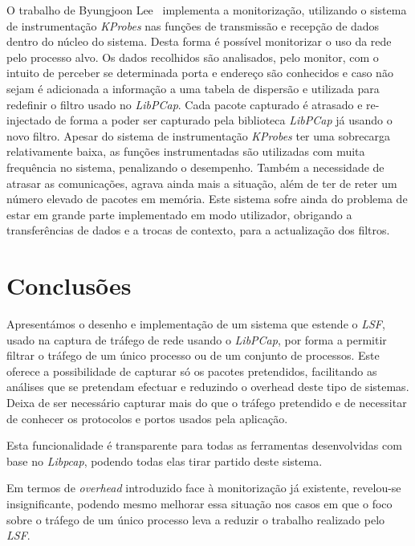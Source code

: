 \documentclass[a4paper]{llncs}
\begin{document}
O trabalho de Byungjoon Lee~\cite{1688981} implementa a monitorização, utilizando o sistema de instrumentação \textit{KProbes} nas funções de transmissão e recepção de dados dentro do núcleo do sistema.
 Desta forma é possível monitorizar o uso da rede pelo processo alvo. Os dados recolhidos são analisados, pelo monitor, com o intuito de perceber se determinada porta e endereço são conhecidos e caso não sejam é adicionada a informação a uma tabela de dispersão e utilizada para redefinir o filtro usado no \textit{LibPCap}.
 Cada pacote capturado  é atrasado e re-injectado de forma a poder ser capturado pela biblioteca \textit{LibPCap} já usando o novo filtro.
 Apesar do sistema de instrumentação \textit{KProbes} ter uma sobrecarga relativamente baixa, as funções instrumentadas são utilizadas com muita frequência no sistema, penalizando o desempenho.
 Também a necessidade de atrasar as comunicações, agrava ainda mais a situação, além de ter de reter um número elevado de pacotes em memória.
 Este sistema sofre ainda do problema de estar em grande parte implementado em modo utilizador, obrigando a transferências de dados e a trocas de contexto, para a actualização dos filtros.



\section{Conclusões}
\label{sec:conclusions}

Apresentámos o desenho e implementação de um sistema que estende o \textit{LSF}, usado na captura de tráfego de rede usando o \textit{LibPCap}, por forma a permitir filtrar o tráfego de um único processo ou de um conjunto de processos.
 Este oferece a possibilidade de capturar só os pacotes pretendidos, facilitando as análises que se pretendam efectuar e reduzindo o overhead deste tipo de sistemas.
 Deixa de ser necessário capturar mais do que o tráfego pretendido e de necessitar de conhecer os protocolos e portos usados pela aplicação.

Esta funcionalidade é transparente para todas as ferramentas desenvolvidas com base no \textit{Libpcap}, podendo todas elas tirar partido deste sistema.

Em termos de \textit{overhead} introduzido face à monitorização já existente, revelou-se insignificante, podendo mesmo melhorar essa situação nos casos em que o foco sobre o tráfego de um único processo leva a reduzir o trabalho realizado pelo \textit{LSF}.
\end{document}
